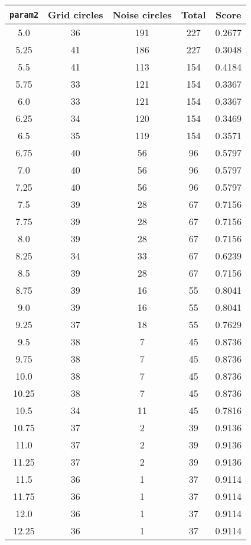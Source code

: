 \documentclass[letterpaper, 12pt]{article}
\begin{document}
\begin{longtable}{|c|c|c|c|c|}
\hline
\textbf{\texttt{param2}} & \textbf{Grid circles} & \textbf{Noise circles} & \textbf{Total} & \textbf{Score} \\
\hline
5.0 & 36 & 191 & 227 & 0.2677 \\
\hline
5.25 & 41 & 186 & 227 & 0.3048 \\
\hline
5.5 & 41 & 113 & 154 & 0.4184 \\
\hline
5.75 & 33 & 121 & 154 & 0.3367 \\
\hline
6.0 & 33 & 121 & 154 & 0.3367 \\
\hline
6.25 & 34 & 120 & 154 & 0.3469 \\
\hline
6.5 & 35 & 119 & 154 & 0.3571 \\
\hline
6.75 & 40 & 56 & 96 & 0.5797 \\
\hline
7.0 & 40 & 56 & 96 & 0.5797 \\
\hline
7.25 & 40 & 56 & 96 & 0.5797 \\
\hline
7.5 & 39 & 28 & 67 & 0.7156 \\
\hline
7.75 & 39 & 28 & 67 & 0.7156 \\
\hline
8.0 & 39 & 28 & 67 & 0.7156 \\
\hline
8.25 & 34 & 33 & 67 & 0.6239 \\
\hline
8.5 & 39 & 28 & 67 & 0.7156 \\
\hline
8.75 & 39 & 16 & 55 & 0.8041 \\
\hline
9.0 & 39 & 16 & 55 & 0.8041 \\
\hline
9.25 & 37 & 18 & 55 & 0.7629 \\
\hline
9.5 & 38 & 7 & 45 & 0.8736 \\
\hline
9.75 & 38 & 7 & 45 & 0.8736 \\
\hline
10.0 & 38 & 7 & 45 & 0.8736 \\
\hline
10.25 & 38 & 7 & 45 & 0.8736 \\
\hline
10.5 & 34 & 11 & 45 & 0.7816 \\
\hline
10.75 & 37 & 2 & 39 & 0.9136 \\
\hline
11.0 & 37 & 2 & 39 & 0.9136 \\
\hline
11.25 & 37 & 2 & 39 & 0.9136 \\
\hline
11.5 & 36 & 1 & 37 & 0.9114 \\
\hline
11.75 & 36 & 1 & 37 & 0.9114 \\
\hline
12.0 & 36 & 1 & 37 & 0.9114 \\
\hline
12.25 & 36 & 1 & 37 & 0.9114 \\
\hline

\end{longtable}
\end{document}
